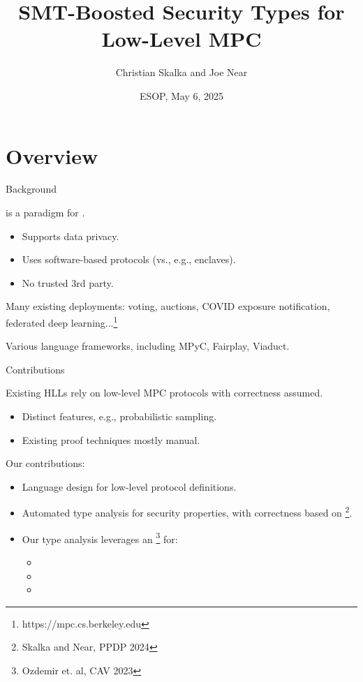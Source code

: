 \documentclass{beamer}
\title{SMT-Boosted Security Types for Low-Level MPC}
\author{Christian Skalka and Joe Near}
\date{ESOP, May 6, 2025}
\begin{document}
\begin{frame}
    \titlepage 
\end{frame}

\logo{}



\section{Overview}

\begin{frame}{Background}
  
   is a paradigm for
  .
  \begin{itemize}
  \item Supports data privacy.
  \item Uses software-based protocols (vs., e.g., enclaves).
  \item No trusted 3rd party.
  \end{itemize}
  Many existing deployments: voting, auctions, COVID exposure notification, federated deep learning...\footnote{https://mpc.cs.berkeley.edu}

  \medskip

  Various language frameworks, including MPyC, Fairplay, Viaduct.
\end{frame}

\begin{frame}{Contributions}

  Existing HLLs rely on low-level MPC protocols with correctness
  assumed.
  \begin{itemize}
  \item Distinct features, e.g., probabilistic sampling.
  \item Existing proof techniques mostly manual.
  \end{itemize}
  Our contributions:
  \begin{itemize}
  \item Language design for low-level protocol definitions.
  \item Automated type analysis for security properties, with correctness based on
    \footnote{Skalka and Near, PPDP 2024}.
  \item Our type analysis leverages an \footnote{Ozdemir et. al, CAV 2023} for:
    \begin{itemize}
    \item {}
    \item {}
    \item {}
    \end{itemize}
  \end{itemize}
  
\end{frame}
\end{document}
